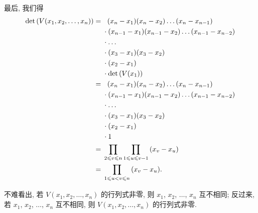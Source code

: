 \documentclass[../libro.tex]{subfiles}
\begin{document}
\begin{example}
    最后, 我们得
    \begin{align*}
        \det {(V(x_1, x_2, \dots, x_n))}
        = {} & \hphantom{\cdot\,\,}
        (x_n - x_1) (x_n - x_2) \dots (x_n - x_{n-1})
        \\
        & \cdot
        (x_{n-1} - x_1) (x_{n-1} - x_2) \dots (x_{n-1} - x_{n-2})
        \\
        & \cdot
        \dots
        \\
        & \cdot
        (x_3 - x_1) (x_3 - x_2)
        \\
        & \cdot
        (x_2 - x_1)
        \\
        & \cdot
        \det {(V(x_1))}
        \\
        = {} & \hphantom{\cdot\,\,}
        (x_n - x_1) (x_n - x_2) \dots (x_n - x_{n-1})
        \\
        & \cdot
        (x_{n-1} - x_1) (x_{n-1} - x_2) \dots (x_{n-1} - x_{n-2})
        \\
        & \cdot
        \dots
        \\
        & \cdot
        (x_3 - x_1) (x_3 - x_2)
        \\
        & \cdot
        (x_2 - x_1)
        \\
        & \cdot
        1
        \\
        = {} &
        \prod_{2 \leq v \leq n}
        {
            \prod_{1 \leq u \leq v-1} {(x_v - x_u)}
        }
        \\
        = {} &
        \prod_{1 \leq u < v \leq n} {(x_v - x_u)}.
    \end{align*}

    不难看出,
    若 \(V(x_1, x_2, \dots, x_n)\) 的行列式非零,
    则 \(x_1\), \(x_2\), \(\dots\), \(x_n\) 互不相同;
    反过来,
    若 \(x_1\), \(x_2\), \(\dots\), \(x_n\) 互不相同,
    则 \(V(x_1, x_2, \dots, x_n)\) 的行列式非零.
\end{example}
\end{document}
